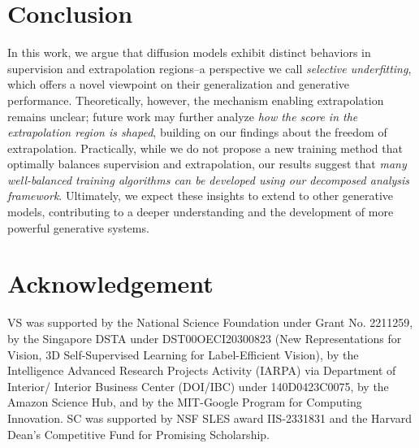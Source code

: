 \section{Conclusion} \label{sec:conclusion}
In this work, we argue that diffusion models exhibit distinct behaviors in supervision and extrapolation regions--a perspective we call \emph{selective underfitting}, which offers a novel viewpoint on their generalization and generative performance. Theoretically, however, the mechanism enabling extrapolation remains unclear; future work may further analyze \emph{how the score in the extrapolation region is shaped}, building on our findings about the freedom of extrapolation. Practically, while we do not propose a new training method that optimally balances supervision and extrapolation, our results suggest that \emph{many well-balanced training algorithms can be developed using our decomposed analysis framework}. Ultimately, we expect these insights to extend to other generative models, contributing to a deeper understanding and the development of more powerful generative systems.


\section*{Acknowledgement}
VS was supported by the National Science Foundation under Grant No. 2211259, by the Singapore DSTA under DST00OECI20300823 (New Representations for Vision, 3D Self-Supervised Learning for Label-Efficient Vision), by the Intelligence Advanced Research Projects Activity (IARPA) via Department of Interior/ Interior Business Center (DOI/IBC) under 140D0423C0075, by the Amazon Science Hub, and by the MIT-Google Program for Computing Innovation. SC was supported by NSF SLES award IIS-2331831 and the Harvard Dean's Competitive Fund for Promising Scholarship.